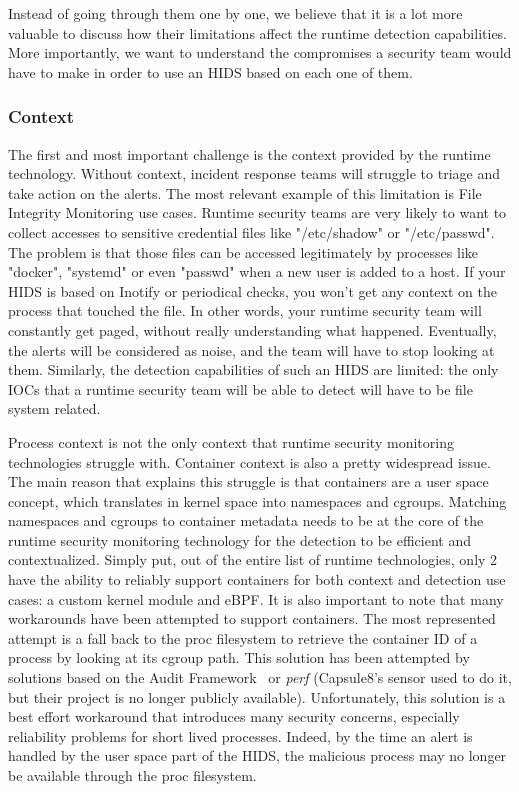 Instead of going through them one by one, we believe that it is a lot more valuable to discuss how their limitations affect the runtime detection capabilities.
More importantly, we want to understand the compromises a security team would have to make in order to use an HIDS based on each one of them.

\subsubsection{Context}

The first and most important challenge is the context provided by the runtime technology.
Without context, incident response teams will struggle to triage and take action on the alerts.
The most relevant example of this limitation is File Integrity Monitoring use cases.
Runtime security teams are very likely to want to collect accesses to sensitive credential files like "/etc/shadow" or "/etc/passwd".
The problem is that those files can be accessed legitimately by processes like "docker", "systemd" or even "passwd" when a new user is added to a host.
If your HIDS is based on Inotify or periodical checks, you won’t get any context on the process that touched the file.
In other words, your runtime security team will constantly get paged, without really understanding what happened.
Eventually, the alerts will be considered as noise, and the team will have to stop looking at them.
Similarly, the detection capabilities of such an HIDS are limited: the only IOCs that a runtime security team will be able to detect will have to be file system related.

Process context is not the only context that runtime security monitoring technologies struggle with.
Container context is also a pretty widespread issue.
The main reason that explains this struggle is that containers are a user space concept, which translates in kernel space into namespaces and cgroups.
Matching namespaces and cgroups to container metadata needs to be at the core of the runtime security monitoring technology for the detection to be efficient and contextualized.
Simply put, out of the entire list of runtime technologies, only 2 have the ability to reliably support containers for both context and detection use cases: a custom kernel module and eBPF.
It is also important to note that many workarounds have been attempted to support containers.
The most represented attempt is a fall back to the proc filesystem to retrieve the container ID of a process by looking at its cgroup path.
This solution has been attempted by solutions based on the Audit Framework~\cite{RuntimeSecurityMonitoringWithEBPF:GOAuditContainerID} or \emph{perf} (Capsule8’s sensor used to do it, but their project is no longer publicly available).
Unfortunately, this solution is a best effort workaround that introduces many security concerns, especially reliability problems for short lived processes.
Indeed, by the time an alert is handled by the user space part of the HIDS, the malicious process may no longer be available through the proc filesystem.

